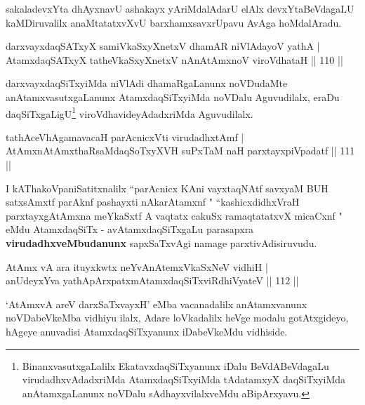 \begin{artha}
sakaladevxYta dhAyxnavU ashakayx yAriMdalAdarU elAlx devxYtaBeVdagaLU kaMDiruvalilx anaMtatatxvXvU barxhamxsavxrUpavu AvAga hoMdalAradu.
\end{artha}

\begin{shl}
darxvayxdaqSATxyX samiVkaSxyXnetxV dhamAR niVlAdayoV yathA |\\
AtamxdaqSATxyX tatheVkaSxyXnetxV nAnAtAmxnoV viroVdhataH \hfill || 110 ||
\end{shl}

\begin{artha}
darxvayxdaqSiTxyiMda niVlAdi dhamaRgaLanunx noVDudaMte anAtamxvasutxgaLanunx AtamxdaqSiTxyiMda noVDalu Aguvudilalx, eraDu daqSiTxgaLigU\footnote{BinanxvasutxgaLalilx EkatavxdaqSiTxyanunx iDalu BeVdABeVdagaLu virudadhxvAdadxriMda AtamxdaqSiTxyiMda tAdatamxyX daqSiTxyiMda anAtamxgaLanunx noVDalu sAdhayxvilalxveMdu aBipArxyavu.} viroVdhavideyAdadxriMda Aguvudilalx.
\end{artha}


\begin{shl}
tathAceVhA\s \s gamavacaH parAcnicxVti virudadhxtAmf |\\
AtAmxnAtAmxthaRsaMdaqSoTxyXVH suPxTaM naH parxtayxpiVpadatf \hfill || 111 ||
\end{shl}

\begin{artha}
I kAThakoVpaniSatitxnalilx ``parAcnicx KAni vayxtaqNAtf savxyaM BUH satxsAmxtf parAknf pashayxti nAkarAtamxnf " ``kashicxdidhxVraH parxtayxgAtAmxna meYkaSxtf A vaqtatx cakuSx ramaqtatatxvX micaCxnf " eMdu AtamxdaqSiTx - avAtamxdaqSiTxgaLu parasapxra \textbf{virudadhxveMbudanunx} sapxSaTxvAgi namage parxtivAdisiruvudu.
\end{artha}


\begin{shl}
AtAmx vA ara ituyxkwtx neYvAnAtemxVkaSxNeV vidhiH |\\
anUdeyxYva yathApArxpatxmAtamxdaqSiTxviRdhiVyateV \hfill || 112 ||
\end{shl}

`AtAmxvA areV darxSaTxvayxH' eMba vacanadalilx anAtamxvanunx noVDabeVkeMba vidhiyu ilalx, Adare loVkadalilx heVge modalu gotAtxgideyo, hAgeye anuvadisi AtamxdaqSiTxyanunx iDabeVkeMdu vidhiside.

